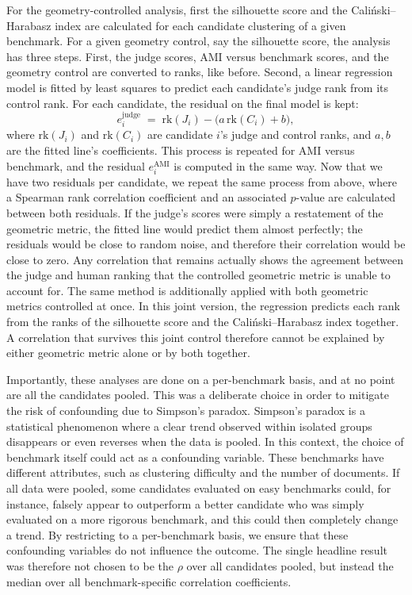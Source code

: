 \documentclass[11pt,a4paper,oneside]{report}
\begin{document}
For the geometry-controlled analysis, first the silhouette score and the Cali\'nski--Harabasz index are calculated for each candidate clustering of a given benchmark. For a given geometry control, say the silhouette score, the analysis has three steps. First, the judge scores, AMI versus benchmark scores, and the geometry control are converted to ranks, like before. Second, a linear regression model is fitted by least squares to predict each candidate's judge rank from its control rank. For each candidate, the residual on the final model is kept:
\[
e_i^{\mathrm{judge}} \;=\; \mathrm{rk}(J_i) - \bigl(a\,\mathrm{rk}(C_i) +b\bigr),
\]
where $\mathrm{rk}(J_i)$ and $\mathrm{rk}(C_i)$ are candidate $i$'s judge and control ranks, and $a, b$ are the fitted line's coefficients. This process is repeated for AMI versus benchmark, and the residual $e_i^{\mathrm{AMI}}$ is computed in the same way. Now that we have two residuals per candidate, we repeat the same process from above, where a Spearman rank correlation coefficient and an associated $p$-value are calculated between both residuals. If the judge's scores were simply a restatement of the geometric metric, the fitted line would predict them almost perfectly; the residuals would be close to random noise, and therefore their correlation would be close to zero. Any correlation that remains actually shows the agreement between the judge and human ranking that the controlled geometric metric is unable to account for. The same method is additionally applied with both geometric metrics controlled at once. In this joint version, the regression predicts each rank from the ranks of the silhouette score and the Cali\'nski--Harabasz index together. A correlation that survives this joint control therefore cannot be explained by either geometric metric alone or by both together.

Importantly, these analyses are done on a per-benchmark basis, and at no point are all the candidates pooled. This was a deliberate choice in order to mitigate the risk of confounding due to Simpson's paradox. Simpson's paradox is a statistical phenomenon where a clear trend observed within isolated groups disappears or even reverses when the data is pooled. In this context, the choice of benchmark itself could act as a confounding variable. These benchmarks have different attributes, such as clustering difficulty and the number of documents. If all data were pooled, some candidates evaluated on easy benchmarks could, for instance, falsely appear to outperform a better candidate who was simply evaluated on a more rigorous benchmark, and this could then completely change a trend. By restricting to a per-benchmark basis, we ensure that these confounding variables do not influence the outcome. The single headline result was therefore not chosen to be the $\rho$ over all candidates pooled, but instead the median over all benchmark-specific correlation coefficients.
\end{document}

